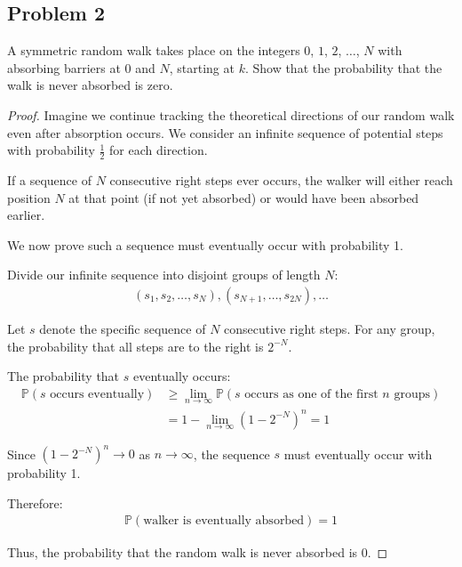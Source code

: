 \documentclass[letterpaper, 11pt]{article}
\newcommand{\1}{\mathds{1}}	%
\theoremstyle{definition}
\begin{document}
\subsection*{Problem 2}
A symmetric random walk takes place on the integers $0$, $1$, $2$, $\ldots$, $N$ with absorbing barriers at $0$ and $N$, starting at $k$. Show that the probability that the walk is never absorbed is zero.
\begin{proof}
  Imagine we continue tracking the theoretical directions of our random walk even after absorption occurs. We consider an infinite sequence of potential steps with probability $\frac{1}{2}$ for each direction.

If a sequence of $N$ consecutive right steps ever occurs, the walker will either reach position $N$ at that point (if not yet absorbed) or would have been absorbed earlier.

We now prove such a sequence must eventually occur with probability 1.

Divide our infinite sequence into disjoint groups of length $N$:
\begin{align*}
(s_1, s_2, \ldots, s_N), (s_{N+1}, \ldots, s_{2N}), \ldots
\end{align*}

Let $s$ denote the specific sequence of $N$ consecutive right steps. For any group, the probability that all steps are to the right is $2^{-N}$.

The probability that $s$ eventually occurs:
\begin{align*}
\mathbb{P}(s \text{ occurs eventually}) &\geq \lim_{n \to \infty} \mathbb{P}(s \text{ occurs as one of the first } n \text{ groups}) \\
&= 1 - \lim_{n \to \infty} (1 - 2^{-N})^n = 1
\end{align*}

Since $(1-2^{-N})^n \to 0$ as $n \to \infty$, the sequence $s$ must eventually occur with probability 1.

Therefore:
\begin{align*}
\mathbb{P}(\text{walker is eventually absorbed}) = 1
\end{align*}

Thus, the probability that the random walk is never absorbed is 0.
 \end{proof}
\end{document}
